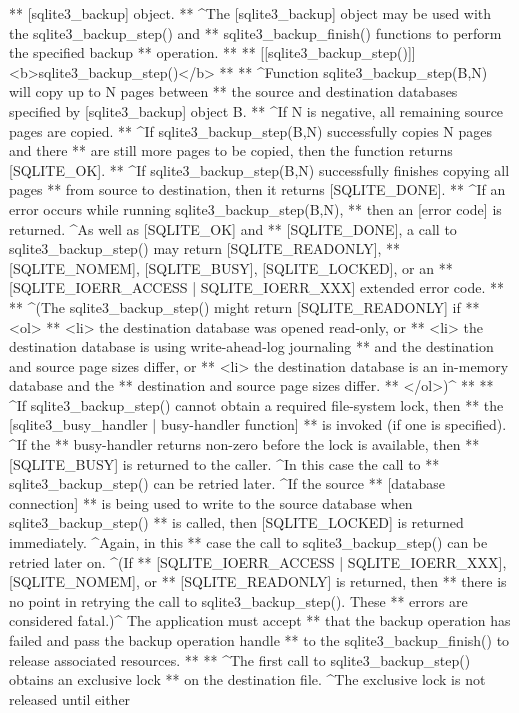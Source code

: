 \begin{Codex}[label=sqlite3.h,numbers=left]
{** [sqlite3_backup] object.
** ^The [sqlite3_backup] object may be used with the sqlite3_backup_step() and
** sqlite3_backup_finish() functions to perform the specified backup 
** operation.
**
** [[sqlite3_backup_step()]] <b>sqlite3_backup_step()</b>
**
** ^Function sqlite3_backup_step(B,N) will copy up to N pages between 
** the source and destination databases specified by [sqlite3_backup] object B.
** ^If N is negative, all remaining source pages are copied. 
** ^If sqlite3_backup_step(B,N) successfully copies N pages and there
** are still more pages to be copied, then the function returns [SQLITE_OK].
** ^If sqlite3_backup_step(B,N) successfully finishes copying all pages
** from source to destination, then it returns [SQLITE_DONE].
** ^If an error occurs while running sqlite3_backup_step(B,N),
** then an [error code] is returned. ^As well as [SQLITE_OK] and
** [SQLITE_DONE], a call to sqlite3_backup_step() may return [SQLITE_READONLY],
** [SQLITE_NOMEM], [SQLITE_BUSY], [SQLITE_LOCKED], or an
** [SQLITE_IOERR_ACCESS | SQLITE_IOERR_XXX] extended error code.
**
** ^(The sqlite3_backup_step() might return [SQLITE_READONLY] if
** <ol>
** <li> the destination database was opened read-only, or
** <li> the destination database is using write-ahead-log journaling
** and the destination and source page sizes differ, or
** <li> the destination database is an in-memory database and the
** destination and source page sizes differ.
** </ol>)^
**
** ^If sqlite3_backup_step() cannot obtain a required file-system lock, then
** the [sqlite3_busy_handler | busy-handler function]
** is invoked (if one is specified). ^If the 
** busy-handler returns non-zero before the lock is available, then 
** [SQLITE_BUSY] is returned to the caller. ^In this case the call to
** sqlite3_backup_step() can be retried later. ^If the source
** [database connection]
** is being used to write to the source database when sqlite3_backup_step()
** is called, then [SQLITE_LOCKED] is returned immediately. ^Again, in this
** case the call to sqlite3_backup_step() can be retried later on. ^(If
** [SQLITE_IOERR_ACCESS | SQLITE_IOERR_XXX], [SQLITE_NOMEM], or
** [SQLITE_READONLY] is returned, then 
** there is no point in retrying the call to sqlite3_backup_step(). These 
** errors are considered fatal.)^  The application must accept 
** that the backup operation has failed and pass the backup operation handle 
** to the sqlite3_backup_finish() to release associated resources.
**
** ^The first call to sqlite3_backup_step() obtains an exclusive lock
** on the destination file. ^The exclusive lock is not released until either 
}
\end{Codex}
